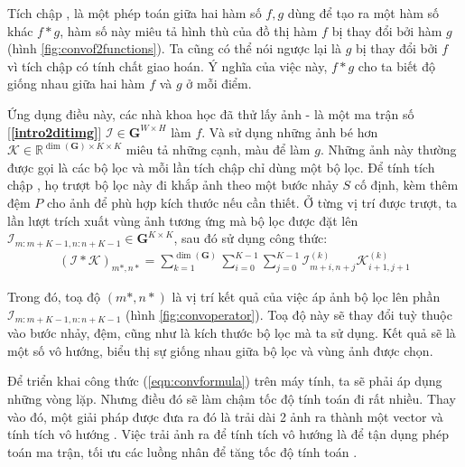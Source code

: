 \documentclass[a4paper, 12pt]{report}
\begin{document}
Tích chập \cite{wikiconv2021}, là một phép toán giữa hai hàm số $f, g$ dùng để tạo ra một hàm số khác $f \ast g$, hàm số này miêu tả hình thù của đồ thị hàm $f$ bị thay đổi bởi hàm $g$ (hình \ref{fig:convof2functions}).
Ta cũng có thể nói ngược lại là $g$ bị thay đổi bởi $f$ vì tích chập có tính chất giao hoán.
Ý nghĩa của việc này, $f \ast g$ cho ta biết độ giống nhau giữa hai hàm $f$ và $g$ ở mỗi điểm.\vspace{5pt}

Ứng dụng điều này, các nhà khoa học đã thử lấy ảnh - là một ma trận số [\textbf{\ref{intro2ditimg}}] $\mathcal{I} \in \bm{G}^{W \times H}$ làm $f$.
Và sử dụng những ảnh bé hơn $\mathcal{K} \in \mathbb{R}^{\dim\left(\bm{G}\right) \times K \times K}$ miêu tả những cạnh, màu để làm $g$.
Những ảnh này thường được gọi là các bộ lọc và mỗi lần tích chập chỉ dùng một bộ lọc.
Để tính tích chập \cite{wikikernalimgpro2021}, họ trượt bộ lọc này đi khắp ảnh theo một bước nhảy $S$ cố định, kèm thêm đệm $P$ \cite{dl2sandp2021} cho ảnh để phù hợp kích thước nếu cần thiết.
Ở từng vị trí được trượt, ta lần lượt trích xuất vùng ảnh tương ứng mà bộ lọc được đặt lên $\mathcal{I}_{m:m + K - 1, n: n + K - 1} \in \bm{G}^{K \times K}$, sau đó sử dụng công thức:
\begin{align}
    \left(\mathcal{I} \ast \mathcal{K}\right)_{m*, n*}=\sum_{k=1}^{\dim\left(\bm{G}\right)}\sum_{i=0}^{K-1}\sum_{j=0}^{K-1}\mathcal{I}^{\left(k\right)}_{m+i,n+j}\mathcal{K}^{\left(k\right)}_{i+1, j+1}\label{eqn:convformula}
\end{align}

Trong đó, toạ độ $(m*, n*)$ là vị trí kết quả của việc áp ảnh bộ lọc lên phần $\mathcal{I}_{m:m + K - 1, n: n + K - 1}$ (hình \ref{fig:convoperator}).
Toạ độ này sẽ thay đổi tuỳ thuộc vào bước nhảy, đệm, cũng như là kích thước bộ lọc mà ta sử dụng.
Kết quả sẽ là một số vô hướng, biểu thị sự giống nhau giữa bộ lọc và vùng ảnh được chọn.\vspace{5pt}

Để triển khai công thức (\ref{eqn:convformula}) trên máy tính, ta sẽ phải áp dụng những vòng lặp.
Nhưng điều đó sẽ làm chậm tốc độ tính toán đi rất nhiều.
Thay vào đó, một giải pháp được đưa ra đó là trải dài 2 ảnh ra thành một vector và tính tích vô hướng \cite{wikidotproduct2021}.
Việc trải ảnh ra để tính tích vô hướng là để tận dụng phép toán ma trận, tối ưu các luồng nhân để tăng tốc độ tính toán \cite{matrixcalfaster2018}.\vspace{5pt}
\end{document}
